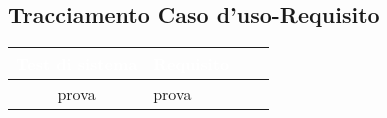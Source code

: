 \subsection{Tracciamento Caso d'uso-Requisito}
{
\renewcommand{\arraystretch}{1.5}
\centering
\begin{longtable}{ c C{4cm} c c}
\textcolor{white}{\textbf{Test di sistema}} & \textcolor{white}{\textbf{Requisito}}\\	
\endhead
prova & prova
\end{longtable}
}






















